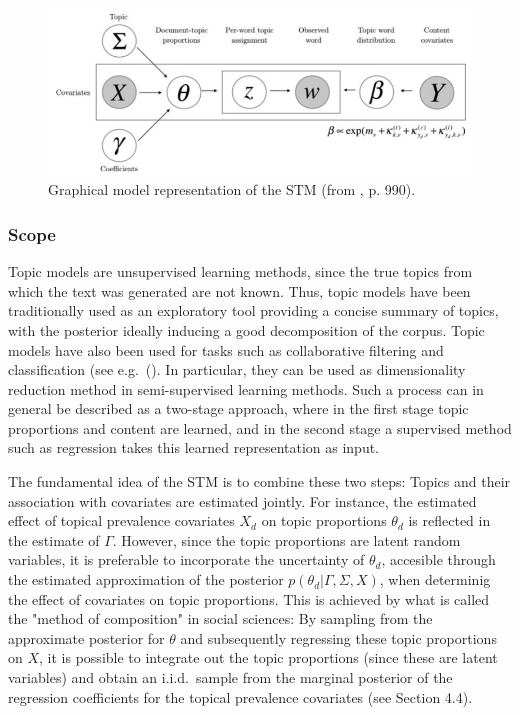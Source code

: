 \begin{figure}[h!]
  \centering
  \captionsetup{justification=centering,margin=2cm}
  \includegraphics[scale = 0.5]{../plots/2/stm_graphical.png}
  \caption{Graphical model representation of the STM (from \cite{roberts2016model}, p. 990).}
  \label{fig:graphical_model}
\end{figure}

\subsubsection*{Scope}

Topic models are unsupervised learning methods, since the true topics from which the text was generated are not known. Thus, topic models have been traditionally used as an exploratory tool providing a concise summary of topics, with the posterior ideally inducing a good decomposition of the corpus. Topic models have also been used for tasks such as collaborative filtering and classification (see e.g.\ (\citealp{blei2003latent}). In particular, they can be used as dimensionality reduction method in semi-supervised learning methods. Such a process can in general be described as a two-stage approach, where in the first stage topic proportions and content are learned, and in the second stage a supervised method such as regression takes this learned representation as input. 

The fundamental idea of the STM is to combine these two steps: Topics and their association with covariates are estimated jointly. For instance, the estimated effect of topical prevalence covariates $X_d$ on topic proportions $\theta_d$ is reflected in the estimate of $\Gamma$. However, since the topic proportions are latent random variables, it is preferable to incorporate the uncertainty of $\theta_d$, accesible through the estimated approximation of the posterior $p(\theta_d | \Gamma, \Sigma, X)$, when determinig the effect of covariates on topic proportions. This is achieved by what is called the "method of composition" in social sciences: By sampling from the approximate posterior for $\theta$ and subsequently regressing these topic proportions on $X$, it is possible to integrate out the topic proportions (since these are latent variables) and obtain an i.i.d.\ sample from the marginal posterior of the regression coefficients for the topical prevalence covariates (see Section 4.4).

